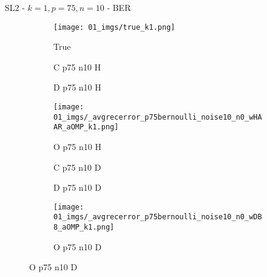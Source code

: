 \begin{frame}{SL2 - $k=1,p=75,n=10$ - BER}{}
\begin{figure}
\begin{subfigure}{0.13\textwidth}
\texttt{[image: 01\_imgs/true\_k1.png]}
\caption*{\tiny True}
\end{subfigure}
\begin{subfigure}{0.13\textwidth}
\caption*{\tiny C p75 n10 H}
\end{subfigure}
\begin{subfigure}{0.13\textwidth}
\caption*{\tiny D p75 n10 H}
\end{subfigure}
\begin{subfigure}{0.13\textwidth}
\texttt{[image: 01\_imgs/\_avgrecerror\_p75bernoulli\_noise10\_n0\_wHAAR\_aOMP\_k1.png]}
\caption*{\tiny O p75 n10 H}
\end{subfigure}
\begin{subfigure}{0.13\textwidth}
\caption*{\tiny C p75 n10 D}
\end{subfigure}
\begin{subfigure}{0.13\textwidth}
\caption*{\tiny D p75 n10 D}
\end{subfigure}
\begin{subfigure}{0.13\textwidth}
\texttt{[image: 01\_imgs/\_avgrecerror\_p75bernoulli\_noise10\_n0\_wDB8\_aOMP\_k1.png]}
\caption*{\tiny O p75 n10 D}
\end{subfigure}

\vspace{5pt}


\end{figure}
\end{frame}
